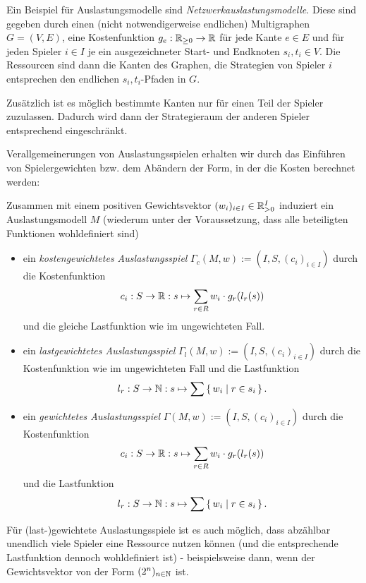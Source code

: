 \begin{bsp}
	Ein Beispiel für Auslastungsmodelle sind \emph{Netzwerkauslastungsmodelle}. Diese sind gegeben durch einen (nicht notwendigerweise endlichen) Multigraphen $G=(V,E)$, eine Kostenfunktion $g_e: \mathbb{R}_{\geq 0} \to \mathbb{R}$ für jede Kante $e \in E$ und für jeden Spieler $i \in I$ je ein ausgezeichneter Start- und Endknoten $s_i, t_i \in V$. Die Ressourcen sind dann die Kanten des Graphen, die Strategien von Spieler $i$ entsprechen den endlichen $s_i,t_i$-Pfaden in $G$. 
	
	Zusätzlich ist es möglich bestimmte Kanten nur für einen Teil der Spieler zuzulassen. Dadurch wird dann der Strategieraum der anderen Spieler entsprechend eingeschränkt.
\end{bsp}

Verallgemeinerungen von Auslastungsspielen erhalten wir durch das Einführen von Spielergewichten bzw. dem Abändern der Form, in der die Kosten berechnet werden:

\begin{defn}\label{def:gewAuslastungsspiel}
	Zusammen mit einem positiven Gewichtsvektor $(w_i)_{i\in I} \in \mathbb{R}_{> 0}^I$ induziert ein Auslastungsmodell $M$ (wiederum unter der Voraussetzung, dass alle beteiligten Funktionen wohldefiniert sind)
	\begin{itemize}
		\item ein \emph{kostengewichtetes Auslastungsspiel} $\Gamma_c(M, w) := (I, S, (c_i)_{i \in I})$ durch die Kostenfunktion
		\[c_i: S \to \mathbb{R}: s \mapsto \sum_{r \in R} w_i\cdot g_r(l_r(s)) \]
		und die gleiche Lastfunktion wie im ungewichteten Fall.
		\item ein \emph{lastgewichtetes Auslastungsspiel} $\Gamma_l(M, w) := (I, S, (c_i)_{i \in I})$ durch die Kostenfunktion wie im ungewichteten Fall und die Lastfunktion 
		\[l_r: S \to \mathbb{N}: s \mapsto \sum\set{w_i | r \in s_i}.\]
		\item ein \emph{gewichtetes Auslastungsspiel} $\Gamma(M, w) := (I, S, (c_i)_{i \in I})$ durch die Kostenfunktion
		\[c_i: S \to \mathbb{R}: s \mapsto \sum_{r \in R} w_i\cdot g_r(l_r(s)) \]
		und die Lastfunktion 
		\[l_r: S \to \mathbb{N}: s \mapsto \sum\set{w_i | r \in s_i}.\]
	\end{itemize}	
\end{defn}

\begin{beob}
	Für (last-)gewichtete Auslastungsspiele ist es auch möglich, dass abzählbar unendlich viele Spieler eine Ressource nutzen können (und die entsprechende Lastfunktion dennoch wohldefiniert ist) - beispielsweise dann, wenn der Gewichtsvektor von der Form $(2^n)_{n \in \mathbb{N}}$ ist.
\end{beob}

